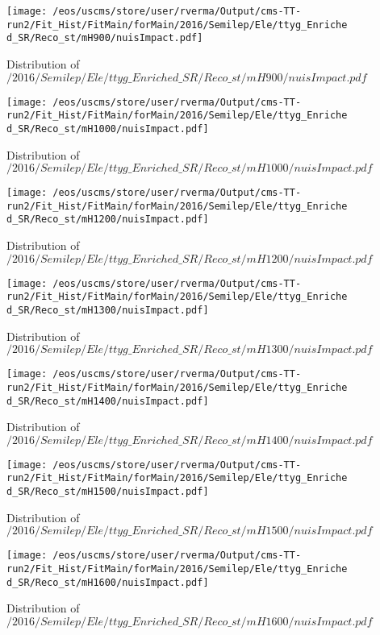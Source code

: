 \begin{figure}
\centering
\texttt{[image: /eos/uscms/store/user/rverma/Output/cms-TT-run2/Fit\_Hist/FitMain/forMain/2016/Semilep/Ele/ttyg\_Enriched\_SR/Reco\_st/mH900/nuisImpact.pdf]}
\caption{Distribution of $/2016/Semilep/Ele/ttyg\_Enriched\_SR/Reco\_st/mH900/nuisImpact.pdf$}
\end{figure}

\begin{figure}
\centering
\texttt{[image: /eos/uscms/store/user/rverma/Output/cms-TT-run2/Fit\_Hist/FitMain/forMain/2016/Semilep/Ele/ttyg\_Enriched\_SR/Reco\_st/mH1000/nuisImpact.pdf]}
\caption{Distribution of $/2016/Semilep/Ele/ttyg\_Enriched\_SR/Reco\_st/mH1000/nuisImpact.pdf$}
\end{figure}

\begin{figure}
\centering
\texttt{[image: /eos/uscms/store/user/rverma/Output/cms-TT-run2/Fit\_Hist/FitMain/forMain/2016/Semilep/Ele/ttyg\_Enriched\_SR/Reco\_st/mH1200/nuisImpact.pdf]}
\caption{Distribution of $/2016/Semilep/Ele/ttyg\_Enriched\_SR/Reco\_st/mH1200/nuisImpact.pdf$}
\end{figure}

\begin{figure}
\centering
\texttt{[image: /eos/uscms/store/user/rverma/Output/cms-TT-run2/Fit\_Hist/FitMain/forMain/2016/Semilep/Ele/ttyg\_Enriched\_SR/Reco\_st/mH1300/nuisImpact.pdf]}
\caption{Distribution of $/2016/Semilep/Ele/ttyg\_Enriched\_SR/Reco\_st/mH1300/nuisImpact.pdf$}
\end{figure}

\begin{figure}
\centering
\texttt{[image: /eos/uscms/store/user/rverma/Output/cms-TT-run2/Fit\_Hist/FitMain/forMain/2016/Semilep/Ele/ttyg\_Enriched\_SR/Reco\_st/mH1400/nuisImpact.pdf]}
\caption{Distribution of $/2016/Semilep/Ele/ttyg\_Enriched\_SR/Reco\_st/mH1400/nuisImpact.pdf$}
\end{figure}

\begin{figure}
\centering
\texttt{[image: /eos/uscms/store/user/rverma/Output/cms-TT-run2/Fit\_Hist/FitMain/forMain/2016/Semilep/Ele/ttyg\_Enriched\_SR/Reco\_st/mH1500/nuisImpact.pdf]}
\caption{Distribution of $/2016/Semilep/Ele/ttyg\_Enriched\_SR/Reco\_st/mH1500/nuisImpact.pdf$}
\end{figure}

\begin{figure}
\centering
\texttt{[image: /eos/uscms/store/user/rverma/Output/cms-TT-run2/Fit\_Hist/FitMain/forMain/2016/Semilep/Ele/ttyg\_Enriched\_SR/Reco\_st/mH1600/nuisImpact.pdf]}
\caption{Distribution of $/2016/Semilep/Ele/ttyg\_Enriched\_SR/Reco\_st/mH1600/nuisImpact.pdf$}
\end{figure}

